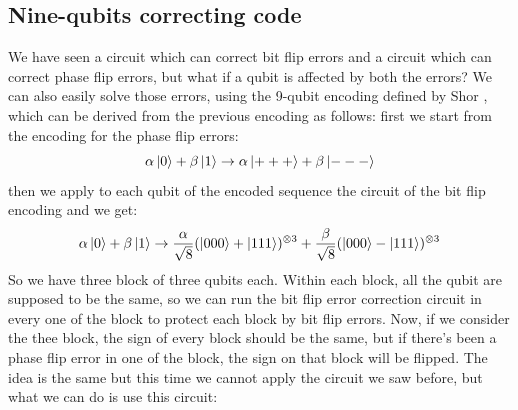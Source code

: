 \documentclass{article}
\begin{document}
	\subsection{Nine-qubits correcting code}
	We have seen a circuit which can correct bit flip errors and a circuit which can correct phase flip errors, but what if a qubit is affected by both the errors? We can also easily solve those errors, using the 9-qubit encoding defined by Shor \cite{PhysRevA.52.R2493}, which can be derived from the previous encoding as follows: first we start from the encoding for the phase flip errors:
	\[ \alpha\ket{0} + \beta\ket{1} \rightarrow \alpha\ket{+++} + \beta\ket{---}\]
	then we apply to each qubit of the encoded sequence the circuit of the bit flip encoding and we get:
	\[ \alpha\ket{0} + \beta\ket{1} \rightarrow \frac{\alpha}{\sqrt{8}}(\ket{000} + \ket{111})^{\otimes 3}+ \frac{\beta}{\sqrt{8}} (\ket{000} - \ket{111})^{\otimes 3}\]
	So we have three block of three qubits each. Within each block, all the qubit are supposed to be the same, so we can run the bit flip error correction circuit in every one of the block to protect each block by bit flip errors. Now, if we consider the thee block, the sign of every block should be the same, but if there's been a phase flip error in one of the block, the sign on that block will be flipped. The idea is the same but this time we cannot apply the circuit we saw before, but what we can do is use this circuit:
\end{document}
